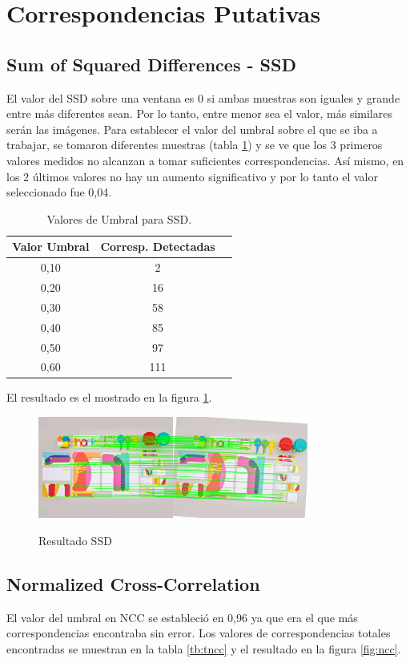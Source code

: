 \documentclass{IEEEtran}
\begin{document}
\section{Correspondencias Putativas}
\subsection{Sum of Squared Differences - SSD}

El valor del SSD sobre una ventana es 0 si ambas
muestras son iguales y grande entre más diferentes sean. 
Por lo tanto, entre menor sea
el valor, más similares serán las imágenes. 
Para establecer el valor del umbral sobre el que se iba 
a trabajar, se tomaron diferentes muestras (tabla \ref{tb:tssd})
y se ve que los 3 primeros valores medidos no alcanzan
a tomar suficientes correspondencias. Así mismo, en los 2 
últimos valores no hay un aumento significativo y por lo tanto
el valor seleccionado fue 0,04.

\begin{table}[H]
\centering
\begin{tabular}{*3c}
\toprule
Valor Umbral & Corresp. Detectadas\\
\midrule
0,10 & 2\\
0,20 & 16\\
0,30 & 58\\
0,40 & 85\\
0,50 & 97\\
0,60 & 111\\
\bottomrule
\end{tabular}
\caption{Valores de Umbral para SSD.}
\label{tb:tssd}
\end{table} 

El resultado es el mostrado en la figura \ref{fig:ssd}.

\begin{figure}[H]
\caption{Resultado SSD}
\centering
\includegraphics[width=8.9cm,natwidth=1200,natheight=450]{figs/ssd.png}
\label{fig:ssd}
\end{figure} 

\subsection{Normalized Cross-Correlation}
El valor del umbral en NCC se estableció en 0,96
ya que era el que más correspondencias encontraba
sin error. Los valores de correspondencias totales
encontradas se muestran en la tabla \ref{tb:tncc}
y el resultado en la figura \ref{fig:ncc}.
\end{document}
